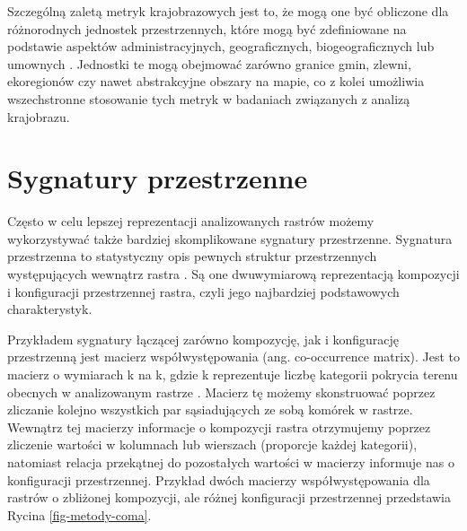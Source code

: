 \documentclass{amuthesis}
\begin{document}
Szczególną zaletą metryk krajobrazowych jest to, że mogą one być
obliczone dla różnorodnych jednostek przestrzennych, które mogą być
zdefiniowane na podstawie aspektów administracyjnych, geograficznych,
biogeograficznych lub umownych \autocite{Pukowiec_Kurda_Sobala_2016}.
Jednostki te mogą obejmować zarówno granice gmin, zlewni, ekoregionów
czy nawet abstrakcyjne obszary na mapie, co z kolei umożliwia
wszechstronne stosowanie tych metryk w badaniach związanych z analizą
krajobrazu.

\hypertarget{sygnatury-przestrzenne}{%
\section{Sygnatury przestrzenne}\label{sygnatury-przestrzenne}}

Często w celu lepszej reprezentacji analizowanych rastrów możemy
wykorzystywać także bardziej skomplikowane sygnatury przestrzenne.
Sygnatura przestrzenna to statystyczny opis pewnych struktur
przestrzennych występujących wewnątrz rastra
\autocite{Jasiewicz_GeoPAT,nowosad_motif}. Są one dwuwymiarową
reprezentacją kompozycji i konfiguracji przestrzennej rastra, czyli jego
najbardziej podstawowych charakterystyk.

Przykładem sygnatury łączącej zarówno kompozycję, jak i konfigurację
przestrzenną jest macierz współwystępowania (ang. co-occurrence matrix).
Jest to macierz o wymiarach k na k, gdzie k reprezentuje liczbę
kategorii pokrycia terenu obecnych w analizowanym rastrze
\autocite{Haralick_1973,Jasiewicz_GeoPAT}. Macierz tę możemy
skonstruować poprzez zliczanie kolejno wszystkich par sąsiadujących ze
sobą komórek w rastrze. Wewnątrz tej macierzy informacje o kompozycji
rastra otrzymujemy poprzez zliczenie wartości w kolumnach lub wierszach
(proporcje każdej kategorii), natomiast relacja przekątnej do
pozostałych wartości w macierzy informuje nas o konfiguracji
przestrzennej. Przykład dwóch macierzy współwystępowania dla rastrów o
zbliżonej kompozycji, ale różnej konfiguracji przestrzennej przedstawia
Rycina \ref{fig-metody-coma}.
\end{document}
